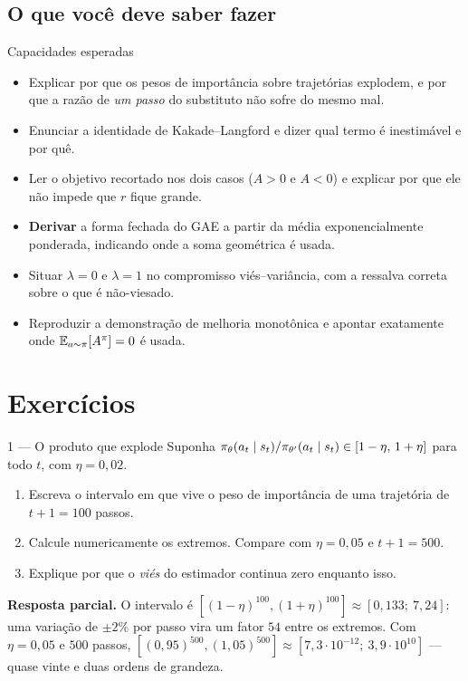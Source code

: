\documentclass[11pt]{article}
\newcommand{\thv}{\theta}
\newcommand{\polth}{\pol_{\thv}}
\newcommand{\Adv}{A}
\newcommand{\Advpi}{A^{\pol}}
\begin{document}
\subsection{O que você deve saber fazer}

\begin{defbox}{Capacidades esperadas}
\begin{itemize}
  \item Explicar por que os pesos de importância sobre trajetórias explodem, e por que a
    razão de \emph{um passo} do substituto não sofre do mesmo mal.
  \item Enunciar a identidade de Kakade--Langford e dizer qual termo é inestimável e por quê.
  \item Ler o objetivo recortado nos dois casos ($\Adv>0$ e $\Adv<0$) e explicar por que
    ele não impede que $r$ fique grande.
  \item \textbf{Derivar} a forma fechada do GAE a partir da média exponencialmente
    ponderada, indicando onde a soma geométrica é usada.
  \item Situar $\lambda = 0$ e $\lambda = 1$ no compromisso viés--variância, com a
    ressalva correta sobre o que é não-viesado.
  \item Reproduzir a demonstração de melhoria monotônica e apontar exatamente onde
    $\E_{a\sim\pol}[\Advpi] = 0$ é usada.
\end{itemize}
\end{defbox}

\section{Exercícios}

\begin{exbox}{1 --- O produto que explode}
  Suponha $\polth(a_t\mid s_t)/\pol_{\thv'}(a_t\mid s_t) \in [1-\eta,\,1+\eta]$ para todo
  $t$, com $\eta = 0{,}02$.
  \begin{enumerate}
    \item Escreva o intervalo em que vive o peso de importância de uma trajetória de
      $t+1 = 100$ passos.
    \item Calcule numericamente os extremos. Compare com $\eta = 0{,}05$ e $t+1 = 500$.
    \item Explique por que o \emph{viés} do estimador continua zero enquanto isso.
  \end{enumerate}
  \textbf{Resposta parcial.} O intervalo é $[(1-\eta)^{100},(1+\eta)^{100}]
  \approx [0{,}133;\ 7{,}24]$: uma variação de $\pm2\%$ por passo vira um fator $54$ entre
  os extremos. Com $\eta=0{,}05$ e $500$ passos, $[(0{,}95)^{500},(1{,}05)^{500}]
  \approx [7{,}3\cdot10^{-12};\ 3{,}9\cdot10^{10}]$ --- quase vinte e duas ordens de grandeza.
\end{exbox}
\end{document}
